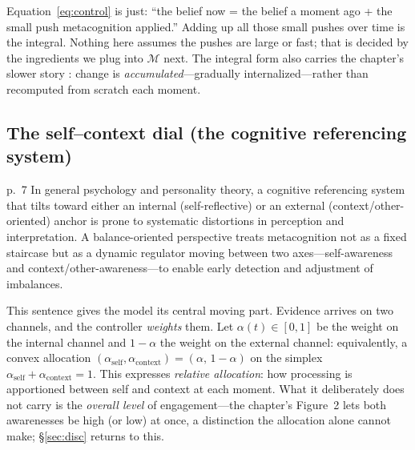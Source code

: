 \documentclass[11pt]{article}
\begin{document}
\begin{plainbox}
Equation~\eqref{eq:control} is just: ``the belief now = the belief a moment ago + the small push metacognition applied.'' Adding up all those small pushes over time is the integral. Nothing here assumes the pushes are large or fast; that is decided by the ingredients we plug into $\mathcal{M}$ next. The integral form also carries the chapter's slower story \citep[\S4.2, p.~10]{HanEtAL2025}: change is \emph{accumulated}---gradually internalized---rather than recomputed from scratch each moment.
\end{plainbox}

\subsection{The self--context dial (the cognitive referencing system)}
\label{sec:dial}

\begin{fromtext}{p.~7}
In general psychology and personality theory, a cognitive referencing system that tilts toward either an internal (self-reflective) or an external (context/other-oriented) anchor is prone to systematic distortions in perception and interpretation. A balance-oriented perspective treats metacognition not as a fixed staircase but as a dynamic regulator moving between two axes---self-awareness and context/other-awareness---to enable early detection and adjustment of imbalances.
\end{fromtext}

\noindent This sentence gives the model its central moving part. Evidence arrives on two channels, and the controller \emph{weights} them. Let $\alpha(t)\in[0,1]$ be the weight on the internal channel and $1-\alpha$ the weight on the external channel: equivalently, a convex allocation $(\alpha_{\text{self}},\alpha_{\text{context}})=(\alpha,\,1-\alpha)$ on the simplex $\alpha_{\text{self}}+\alpha_{\text{context}}=1$. This expresses \emph{relative allocation}: how processing is apportioned between self and context at each moment. What it deliberately does not carry is the \emph{overall level} of engagement---the chapter's Figure~2 lets both awarenesses be high (or low) at once, a distinction the allocation alone cannot make; \S\ref{sec:disc} returns to this.
\end{document}
